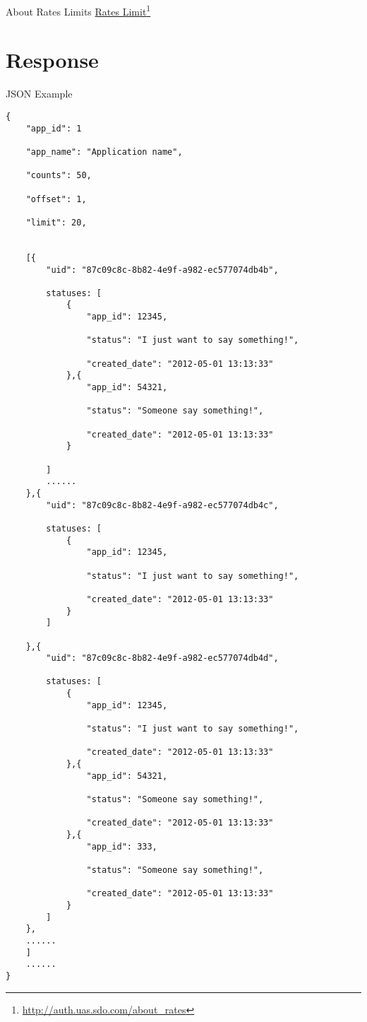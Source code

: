 About Rates Limits \href{http://auth.uas.sdo.com/about_rates}{Rates Limit}\footnote{\href{http://auth.uas.sdo.com/about_rates}{http:/\slash auth.uas.sdo.com\slash about\_rates}}

\section{Response}
\label{response}

JSON Example

\begin{verbatim}
{
    "app_id": 1

    "app_name": "Application name",  

    "counts": 50,  

    "offset": 1,  

    "limit": 20,


    [{
        "uid": "87c09c8c-8b82-4e9f-a982-ec577074db4b",

        statuses: [
            {
                "app_id": 12345,

                "status": "I just want to say something!",

                "created_date": "2012-05-01 13:13:33"
            },{
                "app_id": 54321,

                "status": "Someone say something!",

                "created_date": "2012-05-01 13:13:33"
            }

        ]
        ......
    },{
        "uid": "87c09c8c-8b82-4e9f-a982-ec577074db4c",

        statuses: [
            {
                "app_id": 12345,

                "status": "I just want to say something!",

                "created_date": "2012-05-01 13:13:33"
            }
        ]

    },{
        "uid": "87c09c8c-8b82-4e9f-a982-ec577074db4d",

        statuses: [
            {
                "app_id": 12345,

                "status": "I just want to say something!",

                "created_date": "2012-05-01 13:13:33"
            },{
                "app_id": 54321,

                "status": "Someone say something!",

                "created_date": "2012-05-01 13:13:33"
            },{
                "app_id": 333,

                "status": "Someone say something!",

                "created_date": "2012-05-01 13:13:33"
            }
        ]
    },
    ......
    ]
    ......
}
\end{verbatim}


